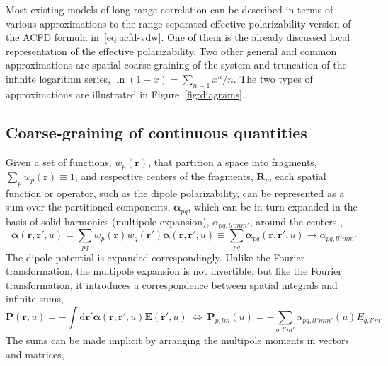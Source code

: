 Most existing models of long-range correlation can be described in terms of various approximations to the range-separated effective-polarizability version of the ACFD formula in~\eqref{eq:acfd-vdw}.
One of them is the already discussed local representation of the effective polarizability.
Two other general and common approximations are spatial coarse-graining of the system and truncation of the infinite logarithm series, $\ln(1-x)=\sum_{n=1}x^n/n$.
The two types of approximations are illustrated in Figure~\ref{fig:diagrams}.

\subsection{Coarse-graining of continuous quantities}\label{sec:coarse-graining}

Given a set of functions, $w_p(\mathbf r)$, that partition a space into fragments, $\sum_p w_p(\mathbf r)\equiv1$, and respective centers of the fragments, $\mathbf R_p$, each spatial function or operator, such as the dipole polarizability, can be represented as a sum over the partitioned components, $\boldsymbol\alpha_{pq}$, which can be in turn expanded in the basis of solid harmonics (multipole expansion), $\alpha_{pq,ll'mm'}$, around the centers \citep{Stone13},
\begin{equation}
  \boldsymbol\alpha(\mathbf r,\mathbf r',u)=\sum_{pq}w_p(\mathbf r)w_q(\mathbf r')\boldsymbol\alpha(\mathbf r,\mathbf r',u)\equiv\sum_{pq}\boldsymbol\alpha_{pq}(\mathbf r,\mathbf r',u)\rightarrow\alpha_{pq,ll'mm'}
\end{equation}
The dipole potential is expanded correspondingly.
Unlike the Fourier transformation, the multipole expansion is not invertible, but like the Fourier transformation, it introduces a correspondence between spatial integrals and infinite sums,
\begin{equation}
  \mathbf P(\mathbf r,u)=-\int\mathrm d\mathbf r'\boldsymbol\alpha(\mathbf r,\mathbf r',u)\mathbf E(\mathbf r',u)
  \ \Leftrightarrow\ 
  \mathbf P_{p,lm}(u)=-\sum_{q,l'm'}\alpha_{pq,ll'mm'}(u)E_{q,l'm'}
\end{equation}
The sums can be made implicit by arranging the multipole moments in vectors and matrices,
